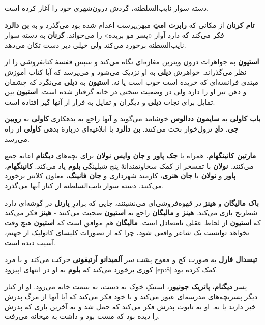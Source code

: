 \documentclass[12pt]{book}
\newcommand{\noun}[1]{{\textbf{#1}}}
\begin{document}
    دسته سوار نایب‌السلطنه، گردش درون‌شهری خود را آغاز کرده است.

    \noun{تام کرنان} از مکانی که \noun{رابرت امتِ} میهن‌پرست اعدام شده بود می‌گذرد و به \noun{بن دالرد}  فکر می‌کند که دارد آواز «پسر مو بریده» را می‌خواند. \noun{کرنان} به دسته سوار نایب‌السطنه برخورد می‌کند ولی خیلی دیر دست تکان می‌دهد.

    \noun{استیون} به جواهرات درون ویترین مغازه‌ای نگاه می‌کند و سپس قفسهٔ کتابفروشی را از نظر می‌گذراند. خواهرش \noun{دیلی} به او نزدیک می‌شود و می‌پرسد که آیا کتاب آموزش مبتدی فرانسه‌ای که خریده است خوب است یا نه. \noun{استیون} به \noun{دیلی} می‌نگرد که چشمان و ذهن تیز او را دارد ولی در وضعیت سختی در خانه گرفتار شده است. \noun{استیون} بین تمایل برای نجات \noun{دیلی} و دیگران و تمایل به فرار از آنها گیر افتاده است.

    \noun{باب کاولی} به \noun{سایمون ددالوس‬} خوشامد می‌گوید و آنها راجع به بدهکاری \noun{کاولی} به \noun{رویبن جی. دادِ} نزول‌خوار بحث می‌کنند. \noun{بن دالرد}  با ابلاغیه‌ای دربارهٔ بدهی \noun{کاولی} از راه می‌رسد.

    \noun{مارتین کانینگهام}، همراه با \noun{جک پاور} و \noun{جان وایس نولان} برای بچه‌های \noun{دیگنام} اعانه جمع می‌کنند. \noun{نولان} با تمسخر از کمک سخاوتمندانهٔ پنج شیلینگی \noun{بلوم} یاد می‌کند. \noun{کانینگهام}، \noun{پاور} و \noun{نولان} با \noun{جان هنری}، کارمند شهرداری و \noun{جان فانینگ}، معاون کلانتر برخورد می‌کنند. دسته سوار نائب‌السلطنه از کنار آنها می‌گذرد.

    \noun{باک مالیگان‬} و \noun{هینز}  در قهوه‌فروشی‌ای می‌نشینند، جایی که برادرِ \noun{پارنل} در گوشه‌ای دارد شطرنج بازی می‌کند. \noun{هینز}  و \noun{مالیگان} راجع به \noun{استیون} صحبت می‌کنند - \noun{هینز}  فکر می‌کند که \noun{استیون} از لحاظ عقلی نامتعادل است. \noun{مالیگان} هم موافق است که \noun{استیون} هیچ وقت نخواهد توانست یک شاعر واقعی شود، چرا که از تصورات کلیسای کاتولیک از جهنم، آسیب دیده است.

    \noun{تیسدال فارل} به صورت کج و معوج پشت سر \noun{آلمیدانو آرتیفونی} حرکت می‌کند و با مرد کوری برخورد می‌کند که \noun{بلوم} به او در انتهای اپیزود \ref{ep:8} کمک کرده بود.

    پسر \noun{دیگنام}، \noun{پاتریک جونیور}، استیکِ خوک به دست، به سمت خانه می‌رود. او از کنار دیگر پسربچه‌های مدرسه‌ای عبور می‌کند و با خود فکر می‌کند که آیا آنها از مرگ پدرش خبر دارند یا نه. او به تابوت پدرش فکر می‌کند که حمل شد و به آخرین باری که پدرش را دیده بود که مست بود و داشت به میخانه می‌رفت.
\end{document}
